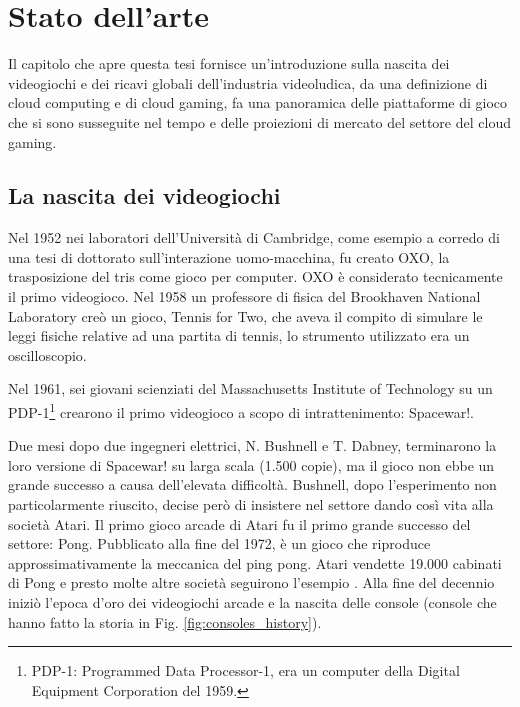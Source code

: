 %
%

\chapter{Stato dell'arte}
Il capitolo che apre questa tesi fornisce un'introduzione sulla nascita dei videogiochi e dei ricavi globali dell'industria videoludica, da una definizione di cloud computing e di cloud gaming, fa una panoramica delle piattaforme di gioco che si sono susseguite nel tempo e delle proiezioni di mercato del settore del cloud gaming.




\section{La nascita dei videogiochi}
Nel 1952 nei laboratori dell'Università di Cambridge, come esempio a corredo di una tesi di dottorato sull'interazione uomo-macchina, fu creato OXO, la trasposizione del tris come gioco per computer. OXO è considerato tecnicamente il primo videogioco. Nel 1958 un professore di fisica del Brookhaven National Laboratory creò un gioco, Tennis for Two, che aveva il compito di simulare le leggi fisiche relative ad una partita di tennis, lo strumento utilizzato era un oscilloscopio.

Nel 1961, sei giovani scienziati del Massachusetts Institute of Technology su un PDP-1\footnote{PDP-1: Programmed Data Processor-1, era un computer della Digital Equipment Corporation del 1959.} crearono il primo videogioco a scopo di intrattenimento: Spacewar!.

Due mesi dopo due ingegneri elettrici, N. Bushnell e T. Dabney, terminarono la loro versione di Spacewar! su larga scala (1.500 copie), ma il gioco non ebbe un grande successo a causa dell'elevata difficoltà. Bushnell, dopo l'esperimento non particolarmente riuscito, decise però di insistere nel settore dando così vita alla società Atari. Il primo gioco arcade di Atari fu il primo grande successo del settore: Pong. Pubblicato alla fine del 1972, è un gioco che riproduce approssimativamente la meccanica del ping pong. Atari vendette 19.000 cabinati di Pong e presto molte altre società seguirono l'esempio \parencite{High_Score}. Alla fine del decennio iniziò l'epoca d'oro dei videogiochi arcade e la nascita delle console (console che hanno fatto la storia in Fig. \ref{fig:consoles_history}).

